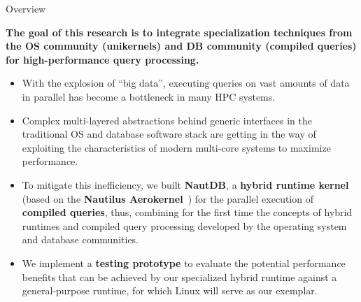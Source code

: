 



\begin{block}{Overview}
\begin{overviewbox}
    \textbf{The goal of this research is to integrate specialization techniques from the OS community
      (unikernels) and  DB community (compiled queries) for high-performance query processing.}
\end{overviewbox}
  \begin{itemize}
  \item   With the explosion of ``big data'', executing queries on vast amounts of data in parallel has become a bottleneck in many HPC systems.
  \item   Complex multi-layered abstractions behind generic interfaces in the traditional OS and database software stack are getting in the way of exploiting the characteristics of modern multi-core systems to maximize performance.
  \item   To mitigate this inefficiency, we built \textbf{NautDB}, a \textbf{hybrid runtime kernel} (based on the \textbf{Nautilus Aerokernel}~\cite{HALE:2015:NAUTILUS}) for the parallel execution of \textbf{compiled queries}, thus, combining for the first time the concepts of hybrid runtimes and compiled query processing developed by the operating system and database communities.
  \item   We implement a \textbf{testing prototype} to evaluate the potential performance benefits that can be achieved by our specialized hybrid runtime against a general-purpose runtime, for which Linux will serve as our exemplar.
  \end{itemize}
\end{block}

